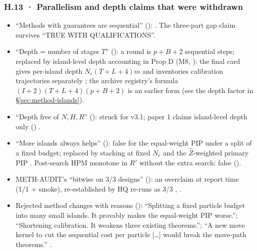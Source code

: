 \subsubsection*{H.13 · Parallelism and depth claims that were withdrawn}
\begin{itemize}[leftmargin=1.3em]
\item ``Methods with guarantees are sequential'' ():  . The three-part gap claim  survives ``TRUE WITH QUALIFICATIONS''.
\item ``Depth = number of stages $T$'' (): a round is $p+B+2$ sequential steps; replaced by island-level depth accounting in Prop D (M8, ): the final card gives per-island depth $N_e(T+L+4)m$ and inventories calibration trajectories separately ; the archive registry's formula $(I+2)(T+L+4)(p+B+2)$  is an earlier form (see the depth factor in \S\ref{sec:method-islands}).
\item ``Depth free of $N,H,R$'' (): struck for v3.1; paper 1 claims island-level depth only () .
\item ``More islands always helps'' (): false for the equal-weight PIP under a split of a fixed budget; replaced by stacking at fixed $N_e$ and the $\hat Z$-weighted primary PIP . Post-search HPM monotone in $R'$ without the extra search: false ().
\item METH-AUDIT's ``bitwise on 3/3 designs'' (): an overclaim at report time (1/1 + smoke), re-established by HQ re-runs as 3/3 , .
\item Rejected method changes with reasons (): ``Splitting a fixed particle budget into many small islands. It provably makes the equal-weight PIP worse.''; ``Shortening calibration. It weakens three existing theorems.''; ``A new move kernel to cut the sequential cost per particle [\ldots] would break the move-path theorems.'' .
\end{itemize}

